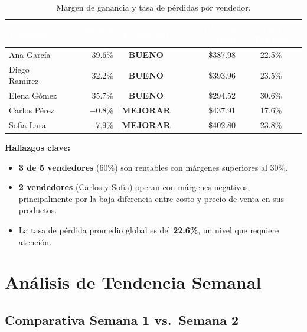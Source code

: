 \documentclass[12pt,letterpaper]{article}
\begin{document}
\begin{table}[H]
\centering
\footnotesize
{}
\begin{tabular}{l r c r c}
\toprule
\rowcolor{tabheader}
\textcolor{white}{\textbf{Vendedor}} &
\textcolor{white}{\textbf{Margen \%}} &
\textcolor{white}{\textbf{Evaluación}} &
\textcolor{white}{\textbf{Pérdida Total}} &
\textcolor{white}{\textbf{Tasa Pérdida}} \\
\midrule
Ana García      & 39.6\% & \textcolor{success}{\textbf{BUENO}}    & \$387.98 & 22.5\% \\
Diego Ramírez   & 32.2\% & \textcolor{success}{\textbf{BUENO}}    & \$393.96 & 23.5\% \\
Elena Gómez     & 35.7\% & \textcolor{success}{\textbf{BUENO}}    & \$294.52 & 30.6\% \\
Carlos Pérez    & $-$0.8\% & \textcolor{danger}{\textbf{MEJORAR}} & \$437.91 & 17.6\% \\
Sofía Lara      & $-$7.9\% & \textcolor{danger}{\textbf{MEJORAR}} & \$402.80 & 23.8\% \\
\bottomrule
\end{tabular}
\caption{Margen de ganancia y tasa de pérdidas por vendedor.}
\end{table}

\textbf{Hallazgos clave:}
\begin{itemize}[leftmargin=2em]
    \item \textbf{3 de 5 vendedores} (60\%) son rentables con márgenes superiores al 30\%.
    \item \textbf{2 vendedores} (Carlos y Sofía) operan con márgenes negativos, principalmente por la baja diferencia entre costo y precio de venta en sus productos.
    \item La tasa de pérdida promedio global es del \textbf{22.6\%}, un nivel que requiere atención.
\end{itemize}

\newpage
\section{Análisis de Tendencia Semanal}

\subsection{Comparativa Semana 1 vs.\ Semana 2}
\end{document}
